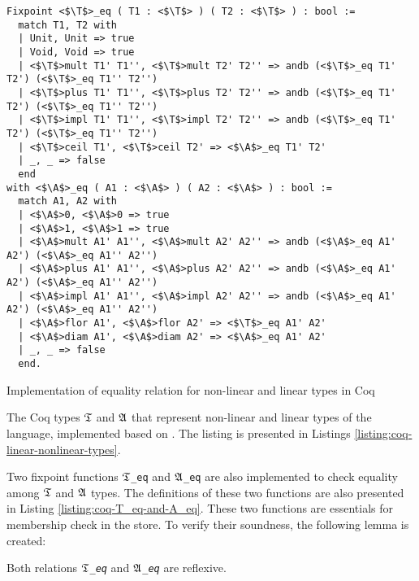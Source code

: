 \begin{listing}[t]
\begin{verbatim}
Fixpoint <$\T$>_eq ( T1 : <$\T$> ) ( T2 : <$\T$> ) : bool :=
  match T1, T2 with
  | Unit, Unit => true
  | Void, Void => true
  | <$\T$>mult T1' T1'', <$\T$>mult T2' T2'' => andb (<$\T$>_eq T1' T2') (<$\T$>_eq T1'' T2'')
  | <$\T$>plus T1' T1'', <$\T$>plus T2' T2'' => andb (<$\T$>_eq T1' T2') (<$\T$>_eq T1'' T2'')
  | <$\T$>impl T1' T1'', <$\T$>impl T2' T2'' => andb (<$\T$>_eq T1' T2') (<$\T$>_eq T1'' T2'')
  | <$\T$>ceil T1', <$\T$>ceil T2' => <$\A$>_eq T1' T2'
  | _, _ => false
  end
with <$\A$>_eq ( A1 : <$\A$> ) ( A2 : <$\A$> ) : bool :=
  match A1, A2 with
  | <$\A$>0, <$\A$>0 => true
  | <$\A$>1, <$\A$>1 => true
  | <$\A$>mult A1' A1'', <$\A$>mult A2' A2'' => andb (<$\A$>_eq A1' A2') (<$\A$>_eq A1'' A2'')
  | <$\A$>plus A1' A1'', <$\A$>plus A2' A2'' => andb (<$\A$>_eq A1' A2') (<$\A$>_eq A1'' A2'')
  | <$\A$>impl A1' A1'', <$\A$>impl A2' A2'' => andb (<$\A$>_eq A1' A2') (<$\A$>_eq A1'' A2'')
  | <$\A$>flor A1', <$\A$>flor A2' => <$\T$>_eq A1' A2'
  | <$\A$>diam A1', <$\A$>diam A2' => <$\A$>_eq A1' A2'
  | _, _ => false
  end.
\end{verbatim}
\caption{Implementation of equality relation for non-linear and linear types in Coq}
\label{listing:coq-T_eq-and-A_eq}
\end{listing}

The Coq types $\mathfrak{T}$ and $\mathfrak{A}$ that represent non-linear and linear types of the language, implemented based on . The listing is presented in Listings \ref{listing:coq-linear-nonlinear-types}.

Two fixpoint functions $\mathfrak{T}$\texttt{\_eq} and $\mathfrak{A}$\texttt{\_eq} are also implemented to check equality among $\mathfrak{T}$ and $\mathfrak{A}$ types. The definitions of these two functions are also presented in Listing \ref{listing:coq-T_eq-and-A_eq}. These two functions are essentials for membership check in the store. To verify their soundness, the following lemma is created:


\begin{lemma}
\label{lemma:T_eq_refl}
Both relations \emph{$\mathfrak{T}$\texttt{\_eq}} and \emph{$\mathfrak{A}$\texttt{\_eq}} are reflexive.
\end{lemma}

